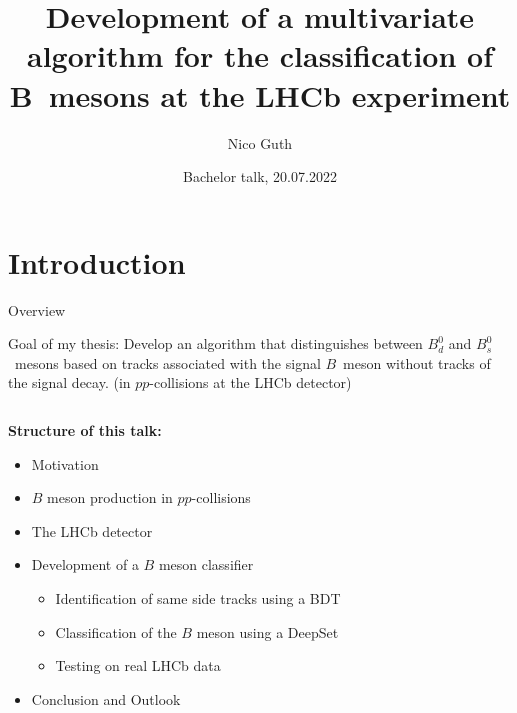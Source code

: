 \documentclass[aspectratio=1610, 10pt]{beamer}
\title{Development of a multivariate algorithm for the classification of B~mesons at the LHCb experiment}
\author[N.~Guth]{Nico Guth}
\institute[AG Albrecht]{Arbeitsgruppe Albrecht \\ Fakultät Physik}
\date{Bachelor talk, 20.07.2022}
\begin{document}
\maketitle

\section*{Introduction}

\begin{frame}{Overview}
  \begin{block}{Goal of my thesis:}
    Develop an algorithm that distinguishes between $B^0_d$ and $B^0_s$~mesons based on tracks associated with the signal $B$~meson without tracks of the signal decay. (in $pp$-collisions at the LHCb detector) 
  \end{block}

  \pause
  \medskip
  \centering
  \begin{columns}
    \begin{column}{0.6\textwidth}
      \textbf{Structure of this talk:}
        \begin{itemize}
          \item Motivation
          \item $B$ meson production in $pp$-collisions
          \item The LHCb detector
          \item Development of a $B$ meson classifier
          \begin{itemize}
            \item Identification of same side tracks using a BDT
            \item Classification of the $B$ meson using a DeepSet
            \item Testing on real LHCb data
          \end{itemize}
          \item Conclusion and Outlook
        \end{itemize}
    \end{column}
  \end{columns}
\end{frame}
\end{document}
